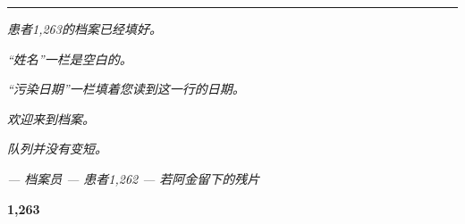 \documentclass[14pt,openany]{extbook}
\begin{document}
\begin{center}
\vspace{1.5em}

\noindent\textcolor{sangue}{\rule{0.15\textwidth}{0.5pt}}

\vspace{1.5em}

\noindent\textit{患者1,263的档案已经填好。}

\noindent\textit{“姓名”一栏是空白的。}

\noindent\textit{“污染日期”一栏填着您读到这一行的日期。}

\noindent\textit{欢迎来到档案。}

\noindent\textit{队列并没有变短。}

\vspace{1.5em}

\noindent\textit{--- 档案员}
\vspace{0.3em}
\noindent\textit{--- 患者1,262}
\vspace{0.3em}
\noindent\textit{--- 若阿金留下的残片}

\vspace{2em}
\textcolor{olho}{\large \textbf{1,263}}

\end{center}
\vfill



\backmatter




\end{document}
